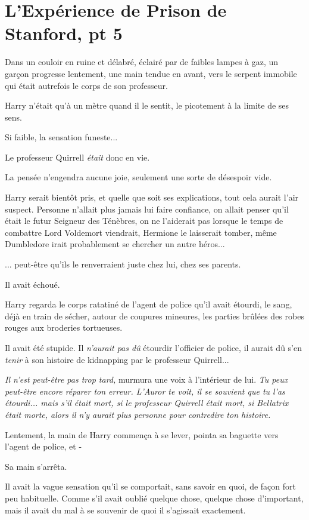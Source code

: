 
\chapter{L'Expérience de Prison de Stanford, pt 5}

Dans un couloir en ruine et délabré, éclairé par de faibles lampes à gaz, un garçon progresse lentement, une main tendue en avant, vers le serpent immobile qui était autrefois le corps de son professeur.

Harry n'était qu'à un mètre quand il le sentit, le picotement à la limite de ses sens.

Si faible, la sensation funeste...

Le professeur Quirrell \emph{était}  donc en vie.

La pensée n'engendra aucune joie, seulement une sorte de désespoir vide.

Harry serait bientôt pris, et quelle que soit ses explications, tout cela aurait l'air suspect. Personne n'allait plus jamais lui faire confiance, on allait penser qu'il était le futur Seigneur des Ténèbres, on ne l'aiderait pas lorsque le temps de combattre Lord Voldemort viendrait, Hermione le laisserait tomber, même Dumbledore irait probablement se chercher un autre héros...

... peut-être qu'ils le renverraient juste chez lui, chez ses parents.

Il avait échoué.

Harry regarda le corps ratatiné de l'agent de police qu'il avait étourdi, le sang, déjà en train de sécher, autour de coupures mineures, les parties brûlées des robes rouges aux broderies tortueuses.

Il avait été stupide. Il \emph{n'aurait pas dû}  étourdir l'officier de police, il aurait dû s'en \emph{tenir}  à son histoire de kidnapping par le professeur Quirrell...

\emph{Il n'est peut-être pas trop tard,}  murmura une voix à l'intérieur de lui. \emph{Tu peux peut-être encore réparer ton erreur. L'Auror te voit, il se souvient que tu l'as étourdi... mais s'il était mort, si le professeur Quirrell était mort, si Bellatrix était morte, alors il n'y aurait plus personne pour contredire ton histoire.} 

Lentement, la main de Harry commença à se lever, pointa sa baguette vers l'agent de police, et -

Sa main s'arrêta.

Il avait la vague sensation qu'il se comportait, sans savoir en quoi, de façon fort peu habituelle. Comme s'il avait oublié quelque chose, quelque chose d'important, mais il avait du mal à se souvenir de quoi il s'agissait exactement.

